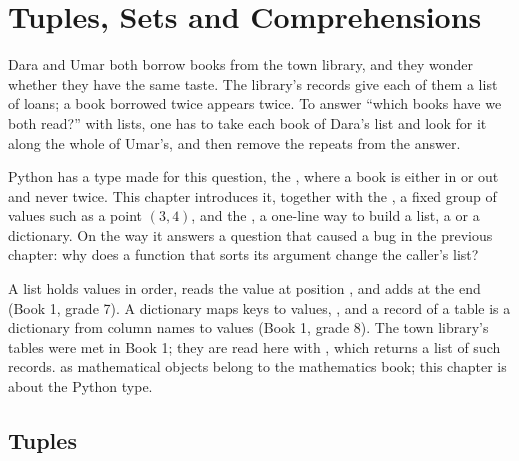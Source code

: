 \chapter{Tuples, Sets and Comprehensions}\label{ch:g10:tuples-sets-comprehensions}

Dara and Umar both borrow books from the town library, and they wonder whether they have the same taste. The
library's records give each of them a list of loans; a book borrowed twice appears twice. To answer ``which books
have we both read?'' with lists, one has to take each book of Dara's list and look for it along the whole of Umar's,
and then remove the repeats from the answer.

Python has a type made for this question, the \emph{}, where a book is either in or out and never twice. This
chapter introduces it, together with the \emph{}, a fixed group of values such as a point $(3, 4)$, and the
\emph{}, a one-line way to build a list, a  or a dictionary. On the way it answers a question that
caused a bug in the previous chapter: why does a function that sorts its argument change the caller's list?

\begin{recall}
A list holds values in order,  reads the value at position , and  adds
 at the end (Book 1, grade 7). A dictionary maps keys to values, , and a record of a table is a
dictionary from column names to values (Book 1, grade 8). The town library's tables were met in Book 1; they are
read here with , which returns a list of such records.  as mathematical objects belong
to the mathematics book; this chapter is about the Python type.
\end{recall}

\section{Tuples}\label{sec:g10:tuples-sets-comprehensions:tuples}

